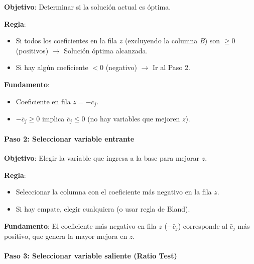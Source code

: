 \begin{tcolorbox}[title=Resumen del paso 1]
  \noindent \textbf{Objetivo}: Determinar si la solución actual es óptima.

  \noindent \textbf{Regla}:
  \begin{itemize}
    \item Si todos los coeficientes en la fila \(z\) (excluyendo la columna \textit{B}) son \(\geq 0\) (positivos) \(\rightarrow\) Solución óptima alcanzada.
    \item Si hay algún coeficiente \(< 0\) (negativo) \(\rightarrow\) Ir al Paso 2.
  \end{itemize}

  \noindent \textbf{Fundamento}:
  \begin{itemize}
    \item Coeficiente en fila \(z = -\bar{c}_j\).
    \item \(-\bar{c}_j \geq 0\) implica \(\bar{c}_j \leq 0\) (no hay variables que mejoren \(z\)).
  \end{itemize}
\end{tcolorbox}

\paragraph{Paso 2: Seleccionar variable entrante}

\begin{tcolorbox}[title=Resumen del paso 2]
  \noindent \textbf{Objetivo}: Elegir la variable que ingresa a la base para mejorar \(z\).
  
  \noindent \textbf{Regla}:
  \begin{itemize}
    \item Seleccionar la columna con el coeficiente más negativo en la fila \(z\).
    \item Si hay empate, elegir cualquiera (o usar regla de Bland).
  \end{itemize}
  
  \noindent \textbf{Fundamento}: El coeficiente más negativo en fila \(z\) (\(-\bar{c}_j\)) corresponde al \(\bar{c}_j\) más positivo, que genera la mayor mejora en \(z\).
\end{tcolorbox}

\paragraph{Paso 3: Seleccionar variable saliente (Ratio Test)}

